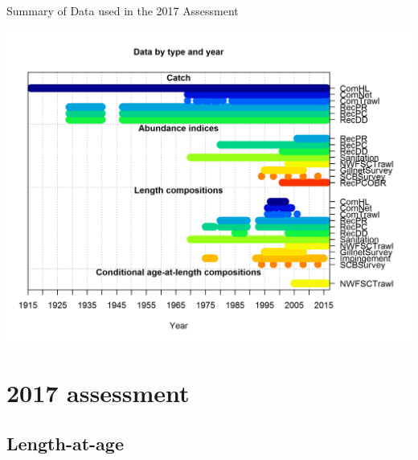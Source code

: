 \documentclass[ignorenonframetext,compress]{beamer}
\begin{document}
\begin{frame}{Summary of Data used in the 2017 Assessment}

\includegraphics{r4ss/plots_mod1/data_plot.png}

\end{frame}

\section{2017 assessment}\label{assessment}

\subsection{Length-at-age}\label{length-at-age}
\end{document}
